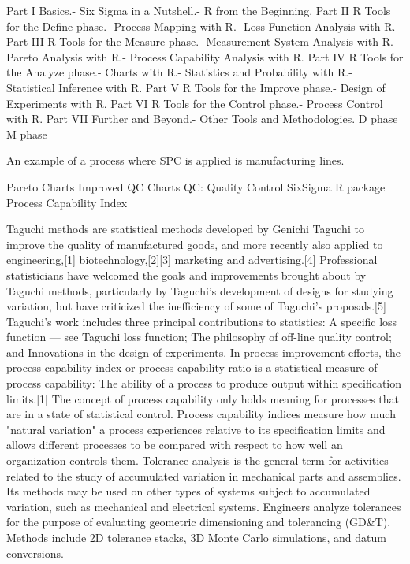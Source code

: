 
Part I Basics.- Six Sigma in a Nutshell.- R from the Beginning.
Part II R Tools for the Define phase.- Process Mapping with R.- Loss Function Analysis with R.
Part III R Tools for the Measure phase.- Measurement System Analysis with R.- Pareto Analysis with R.- Process Capability Analysis with R.
Part IV R Tools for the Analyze phase.- Charts with R.- Statistics and Probability with R.- Statistical Inference with R.
Part V R Tools for the Improve phase.- Design of Experiments with R.
Part VI R Tools for the Control phase.- Process Control with R.
Part VII Further and Beyond.- Other Tools and Methodologies.
D phase
M phase

An example of a process where SPC is applied is manufacturing lines.


Pareto Charts
Improved QC Charts
QC: Quality Control
SixSigma R package
Process Capability Index

Taguchi methods are statistical methods developed by Genichi Taguchi to improve the quality of manufactured goods, and more recently also applied to engineering,[1] biotechnology,[2][3] marketing and advertising.[4] Professional statisticians have welcomed the goals and improvements brought about by Taguchi methods, particularly by Taguchi's development of designs for studying variation, but have criticized the inefficiency of some of Taguchi's proposals.[5]
Taguchi's work includes three principal contributions to statistics:
 A specific loss function — see Taguchi loss function;
 The philosophy of off-line quality control; and
 Innovations in the design of experiments.
In process improvement efforts, the process capability index or process capability ratio is a statistical measure of process capability: The ability of a process to produce output within specification limits.[1] The concept of process capability only holds meaning for processes that are in a state of statistical control. Process capability indices measure how much "natural variation" a process experiences relative to its specification limits and allows different processes to be compared with respect to how well an organization controls them.
Tolerance analysis is the general term for activities related to the study of accumulated variation in mechanical parts and assemblies. Its methods may be used on other types of systems subject to accumulated variation, such as mechanical and electrical systems. Engineers analyze tolerances for the purpose of evaluating geometric dimensioning and tolerancing (GD&T). Methods include 2D tolerance stacks, 3D Monte Carlo simulations, and datum conversions.
 
